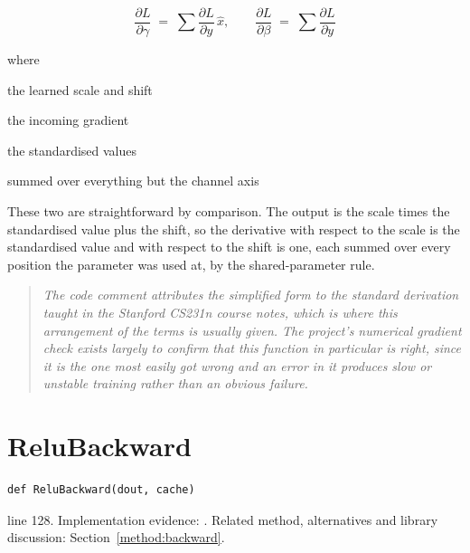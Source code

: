 \begin{equation}
\frac{\partial L}{\partial \gamma} \;=\; \sum \frac{\partial L}{\partial y} \, \hat{x}, \qquad \frac{\partial L}{\partial \beta} \;=\; \sum \frac{\partial L}{\partial y}
\end{equation}

\noindent where
\begin{description}[leftmargin=2.4em,style=nextline,font=\normalfont\ttfamily]\setlength\itemsep{1pt}
  \item[{$\gamma,\, \beta$}] \normalfont the learned scale and shift
  \item[{$\frac{\partial L}{\partial y}$}] \normalfont the incoming gradient
  \item[{$\hat{x}$}] \normalfont the standardised values
  \item[{$\sum$}] \normalfont summed over everything but the channel axis
\end{description}
These two are straightforward by comparison. The output is the scale times the standardised value plus the shift, so the derivative with respect to the scale is the standardised value and with respect to the shift is one, each summed over every position the parameter was used at, by the shared-parameter rule.


\begin{quote}\small\itshape The code comment attributes the simplified form to the standard derivation taught in the Stanford CS231n course notes, which is where this arrangement of the terms is usually given. The project's numerical gradient check exists largely to confirm that this function in particular is right, since it is the one most easily got wrong and an error in it produces slow or unstable training rather than an obvious failure.\end{quote}


\section{ReluBackward}\label{fn:train:ReluBackward}
\begin{lstlisting}[style=sig]
def ReluBackward(dout, cache)
\end{lstlisting}
 line 128. Implementation evidence: \cite{code2026}. Related method, alternatives and library discussion: Section~\ref{method:backward}.


